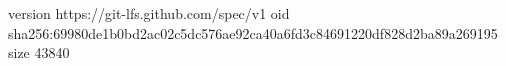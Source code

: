 version https://git-lfs.github.com/spec/v1
oid sha256:69980de1b0bd2ac02c5dc576ae92ca40a6fd3c84691220df828d2ba89a269195
size 43840
